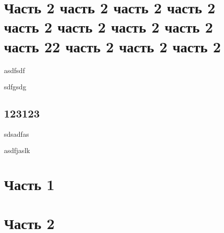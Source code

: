 \documentclass[a4paper,10pt]{article}
\begin{document}
%
%
%
%
%
\section{Часть 2 часть 2 часть 2 часть 2 часть 2 часть 2 часть 2 часть 2 часть 22 часть 2 часть 2 часть 2}
asdfsdf

sdfgsdg

\subsection{123123}

sdsadfas

asdfjaslk

\section{Часть 1}
\subsection{\lipsum[1]}
\lipsum[6-20]

\section{Часть 2}

\label{lastpage}
\end{document}
